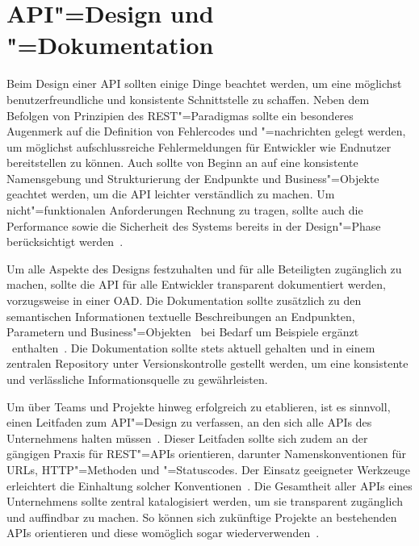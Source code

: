 \section{API"=Design und "=Dokumentation}
Beim Design einer \ac{API} sollten einige Dinge beachtet werden, um eine möglichst benutzerfreundliche und konsistente Schnittstelle zu schaffen.
Neben dem Befolgen von Prinzipien des \ac{REST}"=Paradigmas sollte ein besonderes Augenmerk auf die Definition von Fehlercodes und "=nachrichten gelegt werden, um möglichst aufschlussreiche Fehlermeldungen für Entwickler wie Endnutzer bereitstellen zu können.
Auch sollte von Beginn an auf eine konsistente Namensgebung und Strukturierung der Endpunkte und Business"=Objekte geachtet werden, um die \ac{API} leichter verständlich zu machen.
Um nicht"=funktionalen Anforderungen Rechnung zu tragen, sollte auch die Performance sowie die Sicherheit des Systems bereits in der Design"=Phase berücksichtigt werden~\cite[352\psq,354]{de23}.

Um alle Aspekte des Designs festzuhalten und für alle Beteiligten zugänglich zu machen, sollte die \ac{API} für alle Entwickler transparent dokumentiert werden, vorzugsweise in einer \ac{OAD}.
Die Dokumentation sollte zusätzlich zu den semantischen Informationen textuelle Beschreibungen an Endpunkten, Parametern und Business"=Objekten \textendash\ bei Bedarf um Beispiele ergänzt \textendash\ enthalten~\cite[353]{de23}.
Die Dokumentation sollte stets aktuell gehalten und in einem zentralen Repository unter Versionskontrolle gestellt werden, um eine konsistente und verlässliche Informationsquelle zu gewährleisten.

Um \AF über Teams und Projekte hinweg erfolgreich zu etablieren, ist es sinnvoll, einen Leitfaden zum \ac{API}"=Design zu verfassen, an den sich alle \acp{API} des Unternehmens halten müssen~\cites[3\psq]{kul23}[359]{de23}.
Dieser Leitfaden sollte sich zudem an der gängigen Praxis für \ac{REST}"=\acp{API} orientieren, darunter Namenskonventionen für \acp{URL}, \ac{HTTP}"=Methoden und "=Statuscodes.
Der Einsatz geeigneter Werkzeuge erleichtert die Einhaltung solcher Konventionen~\cite[360]{de23}.
Die Gesamtheit aller \acp{API} eines Unternehmens sollte zentral katalogisiert werden, um sie transparent zugänglich und auffindbar zu machen.
So können sich zukünftige Projekte an bestehenden \acp{API} orientieren und diese womöglich sogar wiederverwenden~\cite[3]{kul23}.

